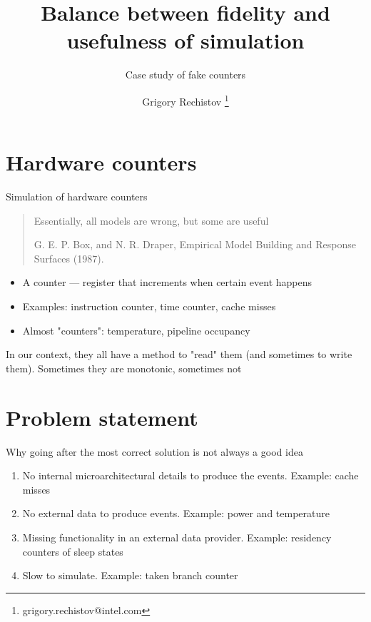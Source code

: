 

\author{Grigory Rechistov \thanks{grigory.rechistov@intel.com}}
\title{Balance between fidelity and usefulness of simulation}
\subtitle{Case study of fake counters}



\startslides

\section{Hardware counters}

\begin{frame}{Simulation of hardware counters}

\begin{quotation}
Essentially, all models are wrong, but some are useful

G. E. P. Box, and N. R. Draper, Empirical Model Building and Response Surfaces (1987). 
\end{quotation}


\begin{itemize}
\item A counter — register that increments when certain event happens
\item Examples: instruction counter, time counter, cache misses
\item Almost "counters": temperature, pipeline occupancy
\end{itemize}

In our context, they all have a method to "read" them (and sometimes to write them).
Sometimes they are monotonic, sometimes not

\end{frame}

\section{Problem statement}

\begin{frame}{Why going after the most correct solution is not always a good idea}

\begin{enumerate}

\item No internal microarchitectural details to produce the events. Example: cache misses

\item No external data to produce events. Example: power and temperature 
  
\item Missing functionality in an external data provider. Example: residency counters of sleep states
  
\item Slow to simulate. Example: taken branch counter

\end{enumerate}

\end{frame}

